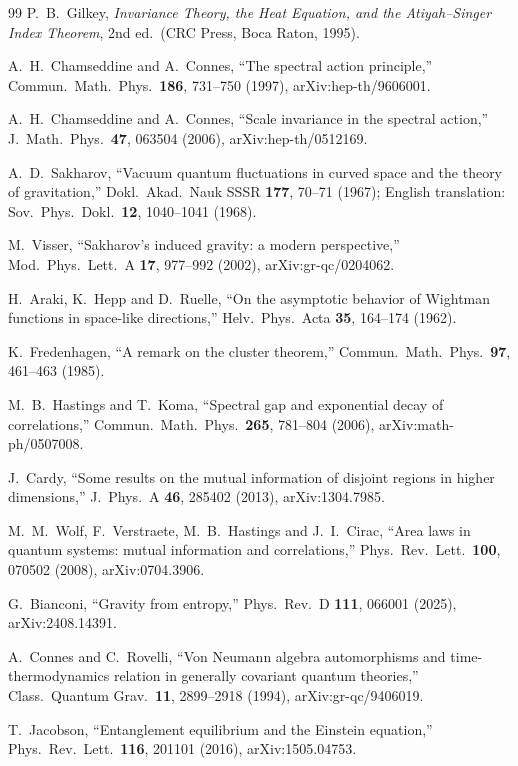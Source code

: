 \documentclass[11pt,a4paper]{article}
\theoremstyle{stmt}
\theoremstyle{defn}
\theoremstyle{rmk}
\numberwithin{equation}{section}
\begin{document}
{\begin{thebibliography}{99}
 P.~B.~Gilkey, \emph{Invariance Theory, the Heat Equation, and the Atiyah--Singer Index Theorem}, 2nd ed.\ (CRC Press, Boca Raton, 1995).

 A.~H.~Chamseddine and A.~Connes, ``The spectral action principle,'' Commun.\ Math.\ Phys.\ \textbf{186}, 731--750 (1997), arXiv:hep-th/9606001.

 A.~H.~Chamseddine and A.~Connes, ``Scale invariance in the spectral action,'' J.\ Math.\ Phys.\ \textbf{47}, 063504 (2006), arXiv:hep-th/0512169.

 A.~D.~Sakharov, ``Vacuum quantum fluctuations in curved space and the theory of gravitation,'' Dokl.\ Akad.\ Nauk SSSR \textbf{177}, 70--71 (1967); English translation: Sov.\ Phys.\ Dokl.\ \textbf{12}, 1040--1041 (1968).

 M.~Visser, ``Sakharov's induced gravity: a modern perspective,'' Mod.\ Phys.\ Lett.\ A \textbf{17}, 977--992 (2002), arXiv:gr-qc/0204062.

 H.~Araki, K.~Hepp and D.~Ruelle, ``On the asymptotic behavior of Wightman functions in space-like directions,'' Helv.\ Phys.\ Acta \textbf{35}, 164--174 (1962).

 K.~Fredenhagen, ``A remark on the cluster theorem,'' Commun.\ Math.\ Phys.\ \textbf{97}, 461--463 (1985).

 M.~B.~Hastings and T.~Koma, ``Spectral gap and exponential decay of correlations,'' Commun.\ Math.\ Phys.\ \textbf{265}, 781--804 (2006), arXiv:math-ph/0507008.

 J.~Cardy, ``Some results on the mutual information of disjoint regions in higher dimensions,'' J.\ Phys.\ A \textbf{46}, 285402 (2013), arXiv:1304.7985.

 M.~M.~Wolf, F.~Verstraete, M.~B.~Hastings and J.~I.~Cirac, ``Area laws in quantum systems: mutual information and correlations,'' Phys.\ Rev.\ Lett.\ \textbf{100}, 070502 (2008), arXiv:0704.3906.

 G.~Bianconi, ``Gravity from entropy,'' Phys.\ Rev.\ D \textbf{111}, 066001 (2025), arXiv:2408.14391.

 A.~Connes and C.~Rovelli, ``Von Neumann algebra automorphisms and time-thermodynamics relation in generally covariant quantum theories,'' Class.\ Quantum Grav.\ \textbf{11}, 2899--2918 (1994), arXiv:gr-qc/9406019.

 T.~Jacobson, ``Entanglement equilibrium and the Einstein equation,'' Phys.\ Rev.\ Lett.\ \textbf{116}, 201101 (2016), arXiv:1505.04753.


\end{thebibliography}}
\end{document}

